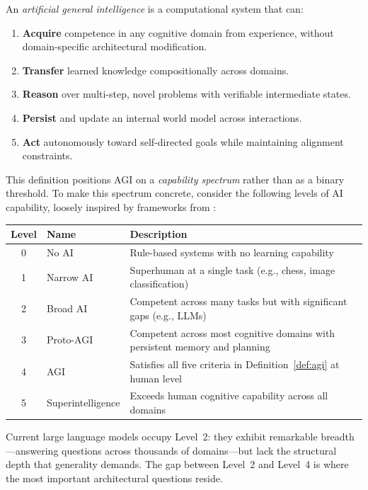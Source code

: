 \begin{dogmadef}
\label{def:agi}
An \emph{artificial general intelligence} is a computational system that can:
\begin{enumerate}[leftmargin=1.5em]
  \item \textbf{Acquire} competence in any cognitive domain from experience, without domain-specific architectural modification.
  \item \textbf{Transfer} learned knowledge compositionally across domains.
  \item \textbf{Reason} over multi-step, novel problems with verifiable intermediate states.
  \item \textbf{Persist} and update an internal world model across interactions.
  \item \textbf{Act} autonomously toward self-directed goals while maintaining alignment constraints.
\end{enumerate}
\end{dogmadef}

This definition positions AGI on a \emph{capability spectrum} rather than as a binary threshold. To make this spectrum concrete, consider the following levels of AI capability, loosely inspired by frameworks from \citet{morris2023levels}:

\begin{center}
\renewcommand{\arraystretch}{1.2}
\begin{tabular}{clp{7.5cm}}
\toprule
\textbf{Level} & \textbf{Name} & \textbf{Description} \\
\midrule
0 & No AI & Rule-based systems with no learning capability \\
1 & Narrow AI & Superhuman at a single task (e.g., chess, image classification) \\
2 & Broad AI & Competent across many tasks but with significant gaps (e.g., LLMs) \\
3 & Proto-AGI & Competent across most cognitive domains with persistent memory and planning \\
4 & AGI & Satisfies all five criteria in Definition~\ref{def:agi} at human level \\
5 & Superintelligence & Exceeds human cognitive capability across all domains \\
\bottomrule
\end{tabular}
\end{center}

Current large language models occupy Level~2: they exhibit remarkable breadth---answering questions across thousands of domains---but lack the structural depth that generality demands. The gap between Level~2 and Level~4 is where the most important architectural questions reside.

